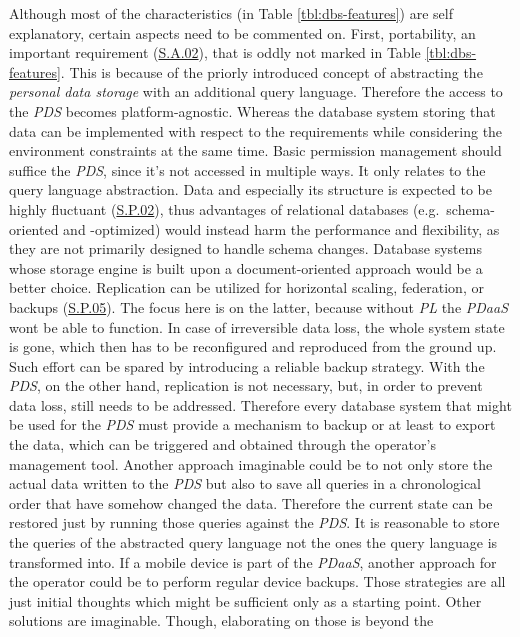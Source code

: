 \documentclass[12pt,english,a4paper,titlepage,cleardoublepage=empty,dottedtoc]{report}
\begin{document}
Although most of the characteristics (in Table \ref{tbl:dbs-features})
are self explanatory, certain aspects need to be commented on. First,
portability, an important requirement
(\protect\hyperlink{sa02}{S.A.02}), that is oddly not marked in Table
\ref{tbl:dbs-features}. This is because of the priorly introduced
concept of abstracting the \emph{personal data storage} with an
additional query language. Therefore the access to the \emph{PDS}
becomes platform-agnostic. Whereas the database system storing that data
can be implemented with respect to the requirements while considering
the environment constraints at the same time. Basic permission
management should suffice the \emph{PDS}, since it's not accessed in
multiple ways. It only relates to the query language abstraction. Data
and especially its structure is expected to be highly fluctuant
(\protect\hyperlink{sp02}{S.P.02}), thus advantages of relational
databases (e.g.~schema-oriented and -optimized) would instead harm the
performance and flexibility, as they are not primarily designed to
handle schema changes. Database systems whose storage engine is built
upon a document-oriented approach would be a better choice. Replication
can be utilized for horizontal scaling, federation, or backups
(\protect\hyperlink{sp05}{S.P.05}). The focus here is on the latter,
because without \emph{PL} the \emph{PDaaS} wont be able to function. In
case of irreversible data loss, the whole system state is gone, which
then has to be reconfigured and reproduced from the ground up. Such
effort can be spared by introducing a reliable backup strategy. With the
\emph{PDS}, on the other hand, replication is not necessary, but, in
order to prevent data loss, still needs to be addressed. Therefore every
database system that might be used for the \emph{PDS} must provide a
mechanism to backup or at least to export the data, which can be
triggered and obtained through the operator's management tool. Another
approach imaginable could be to not only store the actual data written
to the \emph{PDS} but also to save all queries in a chronological order
that have somehow changed the data. Therefore the current state can be
restored just by running those queries against the \emph{PDS}. It is
reasonable to store the queries of the abstracted query language not the
ones the query language is transformed into. If a mobile device is part
of the \emph{PDaaS}, another approach for the operator could be to
perform regular device backups. Those strategies are all just initial
thoughts which might be sufficient only as a starting point. Other
solutions are imaginable. Though, elaborating on those is beyond the
\end{document}
